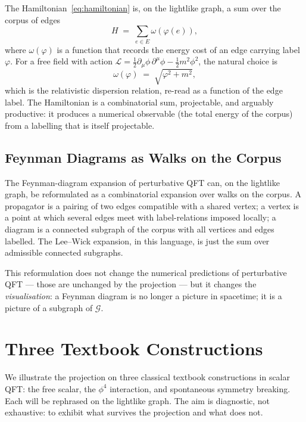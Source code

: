 \documentclass[11pt]{article}
\begin{document}
The Hamiltonian~\eqref{eq:hamiltonian} is, on the lightlike graph, a sum over the corpus of edges
\begin{equation}
H \;=\; \sum_{e \in E} \omega(\varphi(e)),
\label{eq:hamiltonian-sum}
\end{equation}
where $\omega(\varphi)$ is a function that records the energy cost of an edge carrying label $\varphi$. For a free field with action $\mathcal{L} = \tfrac{1}{2} \partial_\mu \phi\, \partial^\mu \phi - \tfrac{1}{2} m^2 \phi^2$, the natural choice is
\[
\omega(\varphi) \;=\; \sqrt{\varphi^2 + m^2},
\]
which is the relativistic dispersion relation, re-read as a function of the edge label. The Hamiltonian is a combinatorial sum, projectable, and arguably productive: it produces a numerical observable (the total energy of the corpus) from a labelling that is itself projectable.

\subsection{Feynman Diagrams as Walks on the Corpus}

The Feynman-diagram expansion of perturbative QFT can, on the lightlike graph, be reformulated as a combinatorial expansion over walks on the corpus. A propagator is a pairing of two edges compatible with a shared vertex; a vertex is a point at which several edges meet with label-relations imposed locally; a diagram is a connected subgraph of the corpus with all vertices and edges labelled. The Lee--Wick expansion, in this language, is just the sum over admissible connected subgraphs.

This reformulation does not change the numerical predictions of perturbative QFT --- those are unchanged by the projection --- but it changes the \emph{visualisation}: a Feynman diagram is no longer a picture in spacetime; it is a picture of a subgraph of $\mathcal{G}$.

\section{Three Textbook Constructions}
\label{sec:examples}

We illustrate the projection on three classical textbook constructions in scalar QFT: the free scalar, the $\phi^4$ interaction, and spontaneous symmetry breaking. Each will be rephrased on the lightlike graph. The aim is diagnostic, not exhaustive: to exhibit what survives the projection and what does not.
\end{document}
